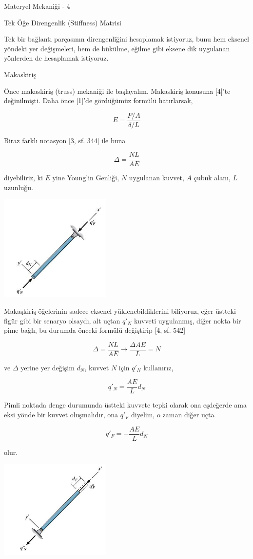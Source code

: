 \documentclass[12pt,fleqn]{article}\usepackage{../../common}
\begin{document}
Materyel Mekaniği - 4

Tek Öğe Direngenlik (Stiffness) Matrisi

Tek bir bağlantı parçasının direngenliğini hesaplamak istiyoruz, bunu hem
eksenel yöndeki yer değişmeleri, hem de bükülme, eğilme gibi eksene dik
uygulanan yönlerden de hesaplamak istiyoruz.

Makaskiriş

Önce makaskiriş (truss) mekaniği ile başlayalım. Makaskiriş konusuna [4]'te
değinilmişti. Daha önce [1]'de gördüğümüz formülü hatırlarsak,

$$
E = \frac{P/A}{\delta / L}
$$

Biraz farklı notasyon [3, sf. 344] ile buna

$$
\Delta = \frac{NL}{AE}
$$

diyebiliriz, ki $E$ yine Young'in Genliği, $N$ uygulanan kuvvet, $A$ çubuk
alanı, $L$ uzunluğu.

\includegraphics[width=15em]{phy_020_strs_05_06.jpg}

Makaşkiriş öğelerinin sadece eksenel yüklenebildiklerini biliyoruz, eğer üstteki
figür gibi bir senaryo olsaydı, alt uçtan $q'_N$ kuvveti uygulanmış, diğer nokta
bir pime bağlı, bu durumda önceki formülü değiştirip [4, sf. 542]

$$
\Delta = \frac{NL}{AE} \to \frac{\Delta AE}{L} = N
$$

ve $\Delta$ yerine yer değişim $d_N$, kuvvet $N$ için $q'_N$ kullanırız,

$$
q'_N = \frac{AE}{L} d_N
$$

Pimli noktada denge durumunda üstteki kuvvete tepki olarak ona eşdeğerde ama
eksi yönde bir kuvvet oluşmalıdır, ona $q'_F$ diyelim, o zaman diğer uçta

$$
q'_F = -\frac{AE}{L} d_N
$$

olur.

\includegraphics[width=15em]{phy_020_strs_05_07.jpg}
\end{document}
